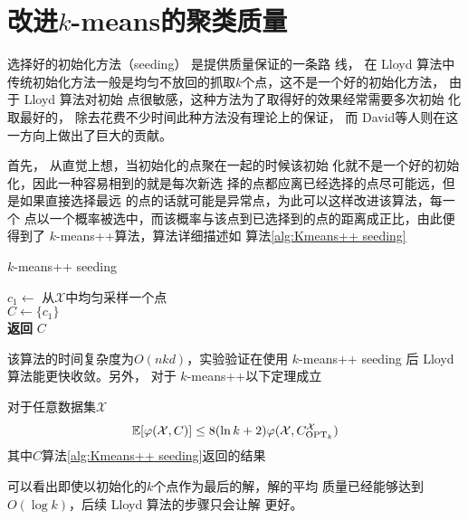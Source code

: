 \section{改进\texorpdfstring{$k$}{k}-means的聚类质量}

选择好的初始化方法（seeding） 是提供质量保证的一条路
线， 在 Lloyd 算法中传统初始化方法一般是均匀不放回的抓取$k$个点，这不是一个好的初始化方法， 由于 Lloyd 算法对初始
点很敏感，这种方法为了取得好的效果经常需要多次初始
化取最好的， 除去花费不少时间此种方法没有理论上的保证，
而 David等人则在这一方向上做出了巨大的贡献。

首先， 从直觉上想，当初始化的点聚在一起的时候该初始
化就不是一个好的初始化，因此一种容易相到的就是每次新选
择的点都应离已经选择的点尽可能远，但是如果直接选择最远
的点的话就可能是异常点，为此可以这样改进该算法，每一个
点以一个概率被选中，而该概率与该点到已选择到的点的距离成正比，由此便得到了 $k$-means++算法，算法详细描述如
算法\ref{alg:Kmeans++ seeding}

\begin{algorithm}
    \caption{$k$-means++ seeding}\label{alg:Kmeans++ seeding}
    $c_1 \gets $ 从$\mathcal{X}$中均匀采样一个点 \\
    $C \gets \{c_1\}$ \\
    \textbf{返回} $C$
\end{algorithm}
该算法的时间复杂度为$O(nkd)$，实验验证在使用 $k$-means++ seeding 后 Lloyd 算法能更快收敛。另外， 对于 $k$-means++以下定理成立
\begin{theorem}
    对于任意数据集$\mathcal{X}$
    \begin{equation*}
    \mathbb{E}[\varphi(\mathcal{X},C)] \leq 8(\ln k + 2) \varphi(\mathcal{X},C_{\text{OPT}_k}^{\mathcal{X}})
    \end{equation*}
    其中$C$算法\ref{alg:Kmeans++ seeding}返回的结果
\end{theorem}
可以看出即使以初始化的$k$个点作为最后的解，解的平均
质量已经能够达到$O(\log k)$，后续 Lloyd 算法的步骤只会让解
更好。

